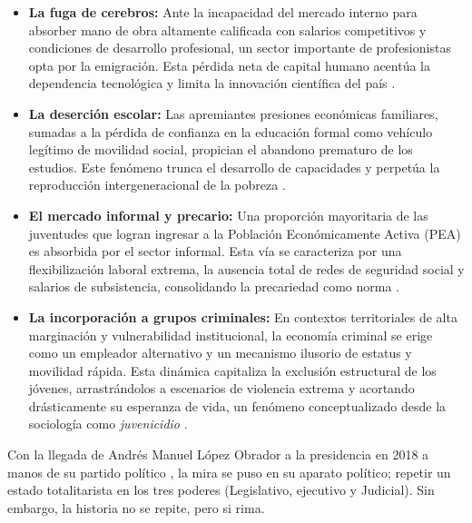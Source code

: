 \begin{itemize}
    \item \textbf{La fuga de cerebros:} Ante la incapacidad del mercado interno para absorber mano de obra altamente calificada con salarios competitivos y 
            condiciones de desarrollo profesional, un sector importante de profesionistas opta por la emigración. Esta pérdida neta de capital humano acentúa 
            la dependencia tecnológica y limita la innovación científica del país \cite{delgado2011fuga}.
    
    \item \textbf{La deserción escolar:} Las apremiantes presiones económicas familiares, sumadas a la pérdida de confianza en la educación formal como vehículo 
            legítimo de movilidad social, propician el abandono prematuro de los estudios. Este fenómeno trunca el desarrollo de capacidades y perpetúa la 
            reproducción intergeneracional de la pobreza \cite{miranda2018desercion}.
    
    \item \textbf{El mercado informal y precario:} Una proporción mayoritaria de las juventudes que logran ingresar a la Población Económicamente Activa (PEA) 
            es absorbida por el sector informal. Esta vía se caracteriza por una flexibilización laboral extrema, la ausencia total de redes de seguridad social y 
            salarios de subsistencia, consolidando la precariedad como norma \cite{levy2008buenas}.
    
    \item \textbf{La incorporación a grupos criminales:} En contextos territoriales de alta marginación y vulnerabilidad institucional, la economía criminal se 
            erige como un empleador alternativo y un mecanismo ilusorio de estatus y movilidad rápida. Esta dinámica capitaliza la exclusión estructural de los 
            jóvenes, arrastrándolos a escenarios de violencia extrema y acortando drásticamente su esperanza de vida, un fenómeno conceptualizado desde la 
            sociología como \textit{juvenicidio} \cite{valenzuela2015juvenicidio}.
\end{itemize}
Con la llegada de Andrés Manuel López Obrador a la presidencia en 2018 a manos de su partido político , 
la mira se puso en su aparato político; repetir un estado totalitarista en los tres poderes (Legislativo, ejecutivo y Judicial). Sin embargo, la historia no 
se repite, pero si rima.